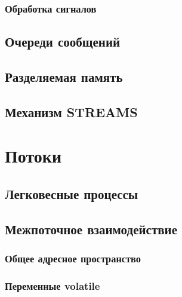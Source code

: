 \documentclass[oneside]{book}
\begin{document}
         \subsection{Обработка сигналов}
         	

      \section{Очереди сообщений}
      	

      \section{Разделяемая память}

      \section{Механизм STREAMS}
      	

   \chapter{Потоки}
   

      \section{Легковесные процессы}
      

      \section{Межпоточное взаимодействие}
      	

         \subsection{Общее адресное пространство}

         \subsection{Переменные volatile}
         		
\end{document}
